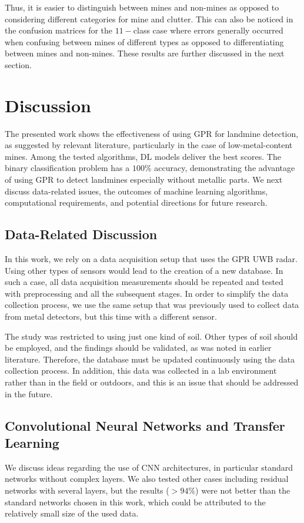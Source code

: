 \documentclass{ieeeaccess}
\begin{document}
Thus, it is easier to distinguish between mines and non-mines as opposed to considering different categories for mine and clutter. This can also be noticed in the confusion matrices for the $11-$class case where errors generally occurred when confusing between mines of different types as opposed to differentiating between mines and non-mines. These results are further discussed in the next section.

\section{Discussion}
The presented work shows the effectiveness of using GPR for landmine detection, as suggested by relevant literature, particularly in the case of low-metal-content mines. Among the tested algorithms, DL models deliver the best scores. The binary classification problem has a $100\%$ accuracy, demonstrating the advantage of using GPR to detect landmines especially without metallic parts. We next discuss data-related issues, the outcomes of machine learning algorithms, computational requirements, and potential directions for future research.

\subsection{Data-Related Discussion}
In this work, we rely on a data acquisition setup that uses the GPR UWB radar. Using other types of sensors would lead to the creation of a new database. In such a case, all data acquisition measurements should be repeated and tested with preprocessing and all the subsequent stages. In order to simplify the data collection process, we use the same setup that was previously used to collect data from metal detectors, but this time with a different sensor.

 The study was restricted to using just one kind of soil. Other types of soil should be employed, and the findings should be validated, as was noted in earlier literature. Therefore, the database must be updated continuously using the data collection process. In addition, this data was collected in a lab environment rather than in the field or outdoors, and this is an issue that should be addressed in the future.

 \subsection{Convolutional Neural Networks and Transfer Learning}
 We discuss ideas regarding the use of CNN architectures, in particular standard networks without complex layers. We also tested other cases including residual networks with several layers, but the results ($>94\%$) were not better than the standard networks chosen in this work, which could be attributed to the relatively small size of the used data.
 
\end{document}
